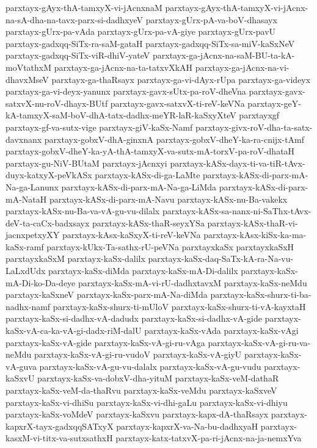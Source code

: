 {parxtayx-gAyx-thA-tamxyX-vi-jAcnxnaM
parxtayx-gAyx-thA-tamxyX-vi-jAcnx-na-sA-dha-na-tavx-parx-si-dadhxyeV
parxtayx-gUrx-pA-va-boV-dhasayx
parxtayx-gUrx-pa-vAda
parxtayx-gUrx-pa-vA-giye
parxtayx-gUrx-pavU
parxtayx-gadxqq-SiTx-ra-saM-gataH
parxtayx-gadxqq-SiTx-sa-miV-kaSxNeV
parxtayx-gadxqq-SiTx-viR-dhiV-yateV
parxtayx-ga-jAcnx-na-saM-BU-ta-kA-moVtathxM
parxtayx-ga-jAcnx-na-ta-tatxvXkAH
parxtayx-ga-jAcnx-na-vi-dhavxMseV
parxtayx-ga-thaRsayx
parxtayx-ga-vi-dAyx-rUpa
parxtayx-ga-videyx
parxtayx-ga-vi-deyx-yanunx
parxtayx-gavx-sUtx-pa-roV-dheVna
parxtayx-gavx-satxvX-nu-roV-dhayx-BUtf
parxtayx-gavx-satxvX-ti-reV-keVNa
parxtayx-geY-kA-tamxyX-saM-boV-dhA-tatx-dadhx-meYR-laR-kaSxyXteV
parxtayxgf
parxtayx-gf-va-sutx-vige
parxtayx-giV-kaSx-Namf
parxtayx-givx-roV-dha-ta-satx-davxnanx
parxtayx-gobxV-dhA-ginxnA
parxtayx-gobxV-dheY-ka-ra-cnijx-tAmf
parxtayx-gobxV-dheY-ka-yA-thA-tamxyX-va-sutx-mA-torxV-pa-roV-dhataH
parxtayx-gu-NiV-BUtaM
parxtayx-jAcnxyi
parxtayx-kASx-dayx-ti-va-tiR-tAvx-duyx-katxyX-peVkASx
parxtayx-kASx-di-ga-LaMte
parxtayx-kASx-di-parx-mA-Na-ga-Lanunx
parxtayx-kASx-di-parx-mA-Na-ga-LiMda
parxtayx-kASx-di-parx-mA-NataH
parxtayx-kASx-di-parx-mA-Navu
parxtayx-kASx-nu-Ba-vakekx
parxtayx-kASx-nu-Ba-va-vA-gu-vu-dilalx
parxtayx-kASx-sa-nanx-ni-SaThx-tAvx-deV-ta-caCx-badxsayx
parxtayx-kASx-thaR-seyxYSa
parxtayx-kASx-thaR-vi-jacnxpetxyXY
parxtayx-kAsx-kaSxyX-ti-reV-keVNa
parxtayx-kAsx-kiSx-ka-ma-kaSx-ramf
parxtayx-kUkx-Ta-sathx-rU-peVNa
parxtayxkaSx
parxtayxkaSxH
parxtayxkaSxM
parxtayx-kaSx-dalilx
parxtayx-kaSx-daq-SaTx-kA-ra-Na-vu-LaLxdUdx
parxtayx-kaSx-diMda
parxtayx-kaSx-mA-Di-dalilx
parxtayx-kaSx-mA-Di-ko-Da-deye
parxtayx-kaSx-mA-vi-rU-dadhxtavxM
parxtayx-kaSx-neMdu
parxtayx-kaSxneV
parxtayx-kaSx-parx-mA-Na-diMda
parxtayx-kaSx-shurx-ti-ba-nadhx-namf
parxtayx-kaSx-shurx-ti-mUloV
parxtayx-kaSx-shurx-ti-vA-kayxtaH
parxtayx-kaSx-si-dadhx-vA-dadudx
parxtayx-kaSx-si-dadhx-vA-gide
parxtayx-kaSx-vA-ca-ka-vA-gi-dadx-riM-dalU
parxtayx-kaSx-vAda
parxtayx-kaSx-vAgi
parxtayx-kaSx-vA-gide
parxtayx-kaSx-vA-gi-ru-vAga
parxtayx-kaSx-vA-gi-ru-va-neMdu
parxtayx-kaSx-vA-gi-ru-vudoV
parxtayx-kaSx-vA-giyU
parxtayx-kaSx-vA-guva
parxtayx-kaSx-vA-gu-vu-dalalx
parxtayx-kaSx-vA-gu-vudu
parxtayx-kaSxvU
parxtayx-kaSx-va-dobxV-dha-yituM
parxtayx-kaSx-veM-dathaR
parxtayx-kaSx-veM-da-thaRvu
parxtayx-kaSx-veMdu
parxtayx-kaSxveV
parxtayx-kaSx-vi-dhiSu
parxtayx-kaSx-vi-dhi-gaLu
parxtayx-kaSx-vi-dhiyu
parxtayx-kaSx-voMdeV
parxtayx-kaSxvu
parxtayx-kapx-dA-thaRsayx
parxtayx-kapxrX-tayx-gadxqqSATxyX
parxtayx-kapxrX-va-Na-bu-dadhxyaH
parxtayx-kasxM-vi-titx-va-sutxsathxH
parxtayx-katx-tatxvX-pa-ri-jAcnx-na-ja-nemxYva
}
